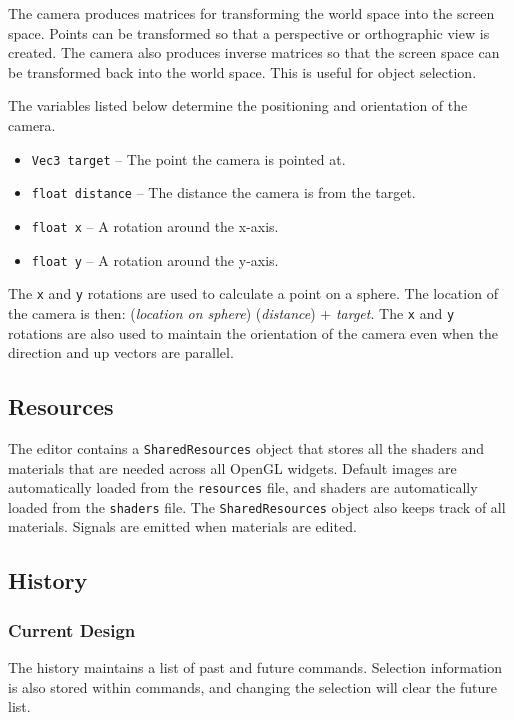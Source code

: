 \documentclass[11pt,letterpaper]{article}
\begin{document}
The camera produces matrices for transforming the world space into the screen space. Points can be transformed so that a perspective or orthographic view is created. The camera also produces inverse matrices so that the screen space can be transformed back into the world space. This is useful for object selection.

The variables listed below determine the positioning and orientation of the camera.
\begin{itemize}
\item \texttt{Vec3 target} -- The point the camera is pointed at.
\item \texttt{float distance} -- The distance the camera is from the target.
\item \texttt{float x} -- A rotation around the x-axis.
\item \texttt{float y} -- A rotation around the y-axis.
\end{itemize}

The \texttt{x} and \texttt{y} rotations are used to calculate a point on a sphere. The location of the camera is then: (\textit{location on sphere}) (\textit{distance}) +  \textit{target}. The \texttt{x} and \texttt{y} rotations are also used to maintain the orientation of the camera even when the direction and up vectors are parallel.

\subsection{Resources}

The editor contains a \texttt{SharedResources} object that stores all the shaders and materials that are needed across all OpenGL widgets. Default images are automatically loaded from the \texttt{resources} file, and shaders are automatically loaded from the \texttt{shaders} file. The \texttt{SharedResources} object also keeps track of all materials. Signals are emitted when materials are edited. 

\subsection{History}

\subsubsection{Current Design}

The history maintains a list of past and future commands. Selection information is also stored within commands, and changing the selection will clear the future list.
\end{document}
